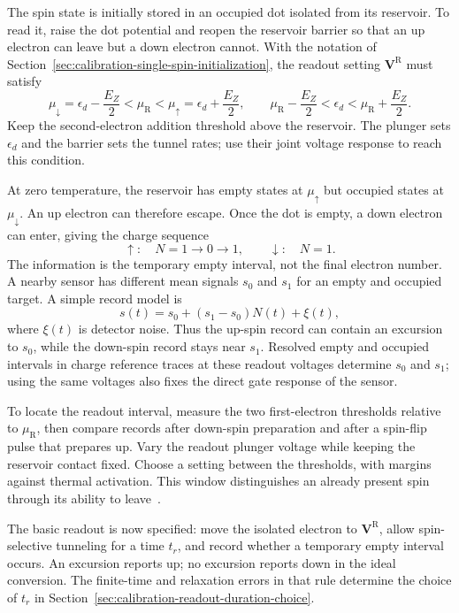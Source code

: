 The spin state is initially stored in an occupied dot isolated from
its reservoir. To read it, raise the dot potential and reopen the
reservoir barrier so that an up electron can leave but a down
electron cannot. With the notation of
Section~\ref{sec:calibration-single-spin-initialization}, the
readout setting $\mathbf V^{\mathrm R}$ must satisfy
\begin{equation}
 \mu_\downarrow=\epsilon_d-\frac{E_Z}{2}
   <\mu_{\mathrm R}<
 \mu_\uparrow=\epsilon_d+\frac{E_Z}{2},
 \qquad
 \mu_{\mathrm R}-\frac{E_Z}{2}<\epsilon_d<
       \mu_{\mathrm R}+\frac{E_Z}{2}.
 \label{eq:calibration-readout-window}
\end{equation}
Keep the second-electron addition threshold above the reservoir.
The plunger sets $\epsilon_d$ and the barrier sets the tunnel
rates; use their joint voltage response to reach this condition.

At zero temperature, the reservoir has empty states at
$\mu_\uparrow$ but occupied states at $\mu_\downarrow$.
An up electron can therefore escape. Once the dot is empty, a
down electron can enter, giving the charge sequence
\[
 \uparrow:\quad N=1\longrightarrow0\longrightarrow1,
 \qquad
 \downarrow:\quad N=1.
\]
The information is the temporary empty interval, not the final
electron number. A nearby sensor has different mean signals
$s_0$ and $s_1$ for an empty and occupied target. A simple record
model is
\begin{equation}
 s(t)=s_0+(s_1-s_0)N(t)+\xi(t),
 \label{eq:calibration-single-spin-record}
\end{equation}
where $\xi(t)$ is detector noise. Thus the up-spin record can
contain an excursion to $s_0$, while the down-spin record stays
near $s_1$. Resolved empty and occupied intervals in charge
reference traces at these readout voltages determine $s_0$ and
$s_1$; using the same voltages also fixes the direct gate response
of the sensor.

To locate the readout interval, measure the two first-electron
thresholds relative to $\mu_{\mathrm R}$, then compare records
after down-spin preparation and after a spin-flip pulse that
prepares up. Vary the readout plunger voltage while keeping the
reservoir contact fixed. Choose a setting between the thresholds,
with margins against thermal activation. This window distinguishes
an already present spin through its ability to leave~\cite{Elzerman2004}.

The basic readout is now specified: move the isolated electron to
$\mathbf V^{\mathrm R}$, allow spin-selective tunneling for a time
$t_r$, and record whether a temporary empty interval occurs.
An excursion reports up; no excursion reports down in the ideal
conversion. The finite-time and relaxation errors in that rule
determine the choice of $t_r$ in
Section~\ref{sec:calibration-readout-duration-choice}.

